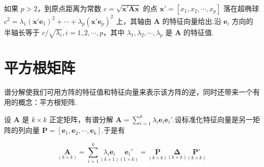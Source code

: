 如果 $p>2$，到原点距离为常数 $c=\sqrt{\bm{x}'\bm{A}\bm{x}}$ 的点 $\bm{x}'=[x_1,x_2,\cdots,x_p]$ 落在超椭球 $c^2=\lambda_1(\bm{x}'\bm{e}_1)^2+\cdots+\lambda_p(\bm{x}'\bm{e}_p)^2$ 上，其轴由 $\bm{A}$ 的特征向量给出.沿 $\bm{e}_i$ 方向的半轴长等于 $c/\sqrt{\lambda_i},i=1,2,\cdots,p$，其中 $\lambda_1,\lambda_2,\cdots,\lambda_p$ 是 $\bm{A}$ 的特征值.

\begin{mvfigure}
\label{fig:2.6}
\end{mvfigure}

\section{平方根矩阵}  %
\label{sec:2.4}

谱分解使我们可用方阵的特征值和特征向量来表示该方阵的逆，同时还带来一个有用的概念：平方根矩阵.

设 $\bm{A}$ 是 $k\times k$ 正定矩阵，有谱分解 $\bm{A}=\sum\limits_{i=1}^{k}\lambda_i\bm{e}_i\bm{e}_i'$.设标准化特征向量是另一矩阵的列向量 $\bm{P}=[\bm{e}_1,\bm{e}_2,\cdots,\bm{e}_k]$.于是有

\label{eq:2-20}
\begin{equation}
\underset{(k\times k)}{\bm{A}}=\sum_{i=1}^{k}\underset{(k\times1)}{\lambda_i\bm{e}_i}\underset{(1\times k)}{\bm{e}_i'}=\underset{(k\times k)}{\bm{P}}\underset{(k\times k)}{\bm{\Delta}}\underset{(k\times k)}{\bm{P}'} \tag{2-20}
\end{equation}
